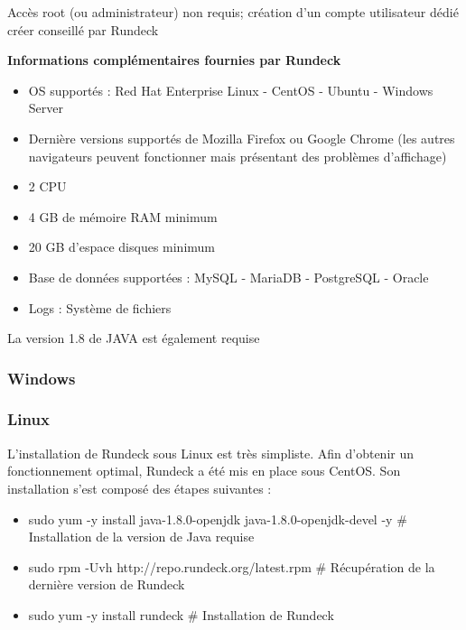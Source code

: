 \documentclass[12pt]{article}
\begin{document}
\vspace{0.5cm}

Accès root (ou administrateur) non requis; création d'un compte utilisateur dédié créer conseillé par Rundeck 

\vspace{0.5cm}

\textbf{Informations complémentaires fournies par Rundeck}
\begin{itemize}
    \item OS supportés :  Red Hat Enterprise Linux - CentOS - Ubuntu - Windows Server
    \item Dernière versions supportés de Mozilla Firefox ou Google Chrome (les autres navigateurs peuvent fonctionner mais présentant des problèmes d'affichage)
    \item 2 CPU
    \item 4 GB de mémoire RAM minimum
    \item 20 GB d'espace disques minimum
    \item Base de données supportées : MySQL - MariaDB - PostgreSQL - Oracle
    \item Logs : Système de fichiers
\end{itemize}

\vspace{0.5cm}

La version 1.8 de JAVA est également requise
\subsubsection{Windows}

\subsubsection{Linux}

L'installation de Rundeck sous Linux est très simpliste. Afin d'obtenir un fonctionnement optimal, Rundeck a été mis en place sous CentOS. Son installation s'est composé des étapes suivantes : 

\vspace{0.5cm}

\begin{itemize}
    \item sudo yum -y install java-1.8.0-openjdk java-1.8.0-openjdk-devel -y \# Installation de la version de Java requise
    \item sudo rpm -Uvh http://repo.rundeck.org/latest.rpm \# Récupération de la dernière version de Rundeck
    \item sudo yum -y install rundeck \# Installation de Rundeck
\end{itemize}
\end{document}
